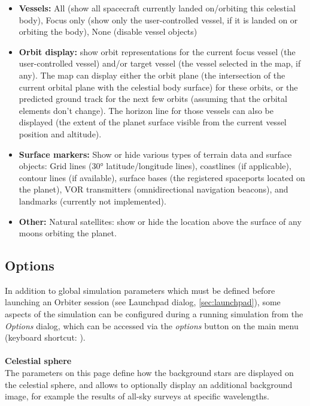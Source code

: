 \documentclass[Orbiter User Manual.tex]{subfiles}
\begin{document}
\begin{itemize}
\item \textbf{Vessels:} All (show all spacecraft currently landed on/orbiting this celestial body), Focus only (show only the user-controlled vessel, if it is landed on or orbiting the body), None (disable vessel objects)
\item \textbf{Orbit display:} show orbit representations for the current focus vessel (the user-controlled vessel) and/or target vessel (the vessel selected in the map, if any). The map can display either the orbit plane (the intersection of the current orbital plane with the celestial body surface) for these orbits, or the predicted ground track for the next few orbits (assuming that the orbital elements don't change). The horizon line for those vessels can also be displayed (the extent of the planet surface visible from the current vessel position and altitude).
\item \textbf{Surface markers:} Show or hide various types of terrain data and surface objects: Grid lines (30° latitude/longitude lines), coastlines (if applicable), contour lines (if available), surface bases (the registered spaceports located on the planet), VOR transmitters (omnidirectional navigation beacons), and landmarks (currently not implemented).
\item \textbf{Other:} Natural satellites: show or hide the location above the surface of any moons orbiting the planet.
\end{itemize}


\subsection{Options}
\label{ssec:menu_options}
In addition to global simulation parameters which must be defined before launching an Orbiter session (see Launchpad dialog, \ref{sec:launchpad}), some aspects of the simulation can be configured during a running simulation from the \textit{Options} dialog, which can be accessed via the \textit{options} button on the main menu (keyboard shortcut: ).\\
\\
\textbf{Celestial sphere}\\
The parameters on this page define how the background stars are displayed on the celestial sphere, and allows to optionally display an additional background image, for example the results of all-sky surveys at specific wavelengths.

\begin{figure}[H]
	\centering
\end{figure}
\end{document}
